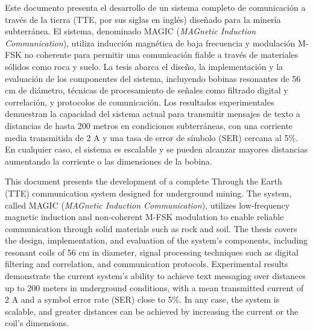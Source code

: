 \documentclass[
	english, %
	letterpaper, oneside
]{book}
\def\documenttitle {Implementation and Characterization of a Through the Earth Communication System for Underground Mining}
\begin{document}
\templatePortrait

\templatePagecfg

\def\documenttitle {Implementación y caracterización de un sistema de comunicación a través de la tierra para minería subterránea.}

\begin{abstractd}
	Este documento presenta el desarrollo de un sistema completo de comunicación a través de la tierra (TTE, por sus siglas en inglés) diseñado para la minería subterránea. El sistema, denominado MAGIC (\textit{MAGnetic Induction Communication}), utiliza inducción magnética de baja frecuencia y modulación M-FSK no coherente para permitir una comunicación fiable a través de materiales sólidos como roca y suelo. La tesis abarca el diseño, la implementación y la evaluación de los componentes del sistema, incluyendo bobinas resonantes de 56 cm de diámetro, técnicas de procesamiento de señales como filtrado digital y correlación, y protocolos de comunicación. Los resultados experimentales demuestran la capacidad del sistema actual para transmitir mensajes de texto a distancias de hasta 200 metros en condiciones subterráneas, con una corriente media transmitida de 2 A y una tasa de error de símbolo (SER) cercana al 5\%. En cualquier caso, el sistema es escalable y se pueden alcanzar mayores distancias aumentando la corriente o las dimensiones de la bobina.

\end{abstractd}


\def\documenttitle {Implementation and Characterization of a Through the Earth Communication System for Underground Mining}

\begin{abstractd}
	This document presents the development of a complete Through the Earth (TTE) communication system designed for underground mining. The system, called MAGIC (\textit{MAGnetic Induction Communication}), utilizes low-frequency magnetic induction and non-coherent M-FSK modulation to enable reliable communication through solid materials such as rock and soil. The thesis covers the design, implementation, and evaluation of the system's components, including resonant coils of 56 cm in diameter, signal processing techniques such as digital filtering and correlation, and communication protocols. Experimental results demonstrate the current system's ability to achieve text messaging over distances up to 200 meters in underground conditions, with a mean transmitted current of 2 A and a symbol error rate (SER) close to 5\%. In any case, the system is scalable, and greater distances can be achieved by increasing the current or the coil's dimensions.
\end{abstractd}
\end{document}
